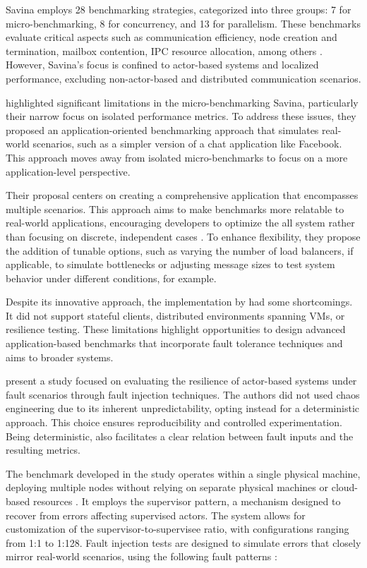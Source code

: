 Savina employs 28 benchmarking strategies, categorized into three groups: 7 for micro-benchmarking, 8 for concurrency, and 13 for parallelism. These benchmarks evaluate critical aspects such as communication efficiency, node creation and termination, mailbox contention, \gls{IPC} resource allocation, among others \cite{Imam2014,Blessing2019}. However, Savina’s focus is confined to actor-based systems and localized performance, excluding non-actor-based and distributed communication scenarios.

\textcite{Blessing2019} highlighted significant limitations in the micro-benchmarking Savina, particularly their narrow focus on isolated performance metrics. To address these issues, they proposed an application-oriented benchmarking approach that simulates real-world scenarios, such as a simpler version of a chat application like Facebook. This approach moves away from isolated micro-benchmarks to focus on a more application-level perspective.

Their proposal centers on creating a comprehensive application that encompasses multiple scenarios. This approach aims to make benchmarks more relatable to real-world applications, encouraging developers to optimize the all system rather than focusing on discrete, independent cases \cite{Blessing2019}. To enhance flexibility, they propose the addition of tunable options, such as varying the number of load balancers, if applicable, to simulate bottlenecks or adjusting message sizes to test system behavior under different conditions, for example.

Despite its innovative approach, the implementation by \textcite{Blessing2019} had some shortcomings. It did not support stateful clients, distributed environments spanning \glspl{VM}, or resilience testing. These limitations highlight opportunities to design advanced application-based benchmarks that incorporate fault tolerance techniques and aims to broader systems.

\textcite{Randtoul2022} present a study focused on evaluating the resilience of actor-based systems under fault scenarios through fault injection techniques. The authors did not used chaos engineering due to its inherent unpredictability, opting instead for a deterministic approach. This choice ensures reproducibility and controlled experimentation. Being deterministic, also facilitates a clear relation between fault inputs and the resulting metrics.

The benchmark developed in the study operates within a single physical machine, deploying multiple nodes without relying on separate physical machines or cloud-based resources \cite{Randtoul2022}. It employs the supervisor pattern, a mechanism designed to recover from errors affecting supervised actors. The system allows for customization of the supervisor-to-supervisee ratio, with configurations ranging from 1:1 to 1:128. Fault injection tests are designed to simulate errors that closely mirror real-world scenarios, using the following fault patterns \cite{Randtoul2022}:

